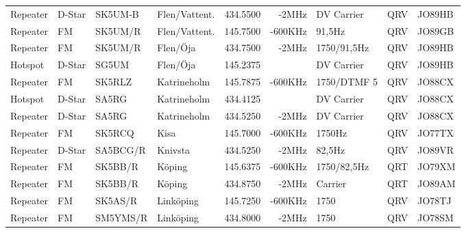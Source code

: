 \begin{landscape}
\begin{longtable}{llllrrlcl}
	Repeater          & D-Star       & SK5UM-B       & Flen/Vattent.     &          434.5500 &          -2MHz & DV Carrier      &       QRV       & JO89HB           \\
	Repeater          & FM           & SK5UM/R       & Flen/Vattent.     &          145.7500 &        -600KHz & 91,5Hz          &       QRV       & JO89GB           \\
	Repeater          & FM           & SK5UM/R       & Flen/Öja          &          434.7500 &          -2MHz & 1750/91,5Hz     &       QRV       & JO89HB           \\
	Hotspot           & D-Star       & SG5UM         & Flen/Öja          &          145.2375 &                & DV Carrier      &       QRV       & JO89HB           \\
	Repeater          & FM           & SK5RLZ        & Katrineholm       &          145.7875 &        -600KHz & 1750/DTMF 5     &       QRV       & JO88CX           \\
	Hotspot           & D-Star       & SA5RG         & Katrineholm       &          434.4125 &                & DV Carrier      &       QRV       & JO88CX           \\
	Repeater          & D-Star       & SA5RG         & Katrineholm       &          434.5250 &          -2MHz & DV Carrier      &       QRV       & JO88CX           \\
	Repeater          & FM           & SK5RCQ        & Kisa              &          145.7000 &        -600KHz & 1750Hz          &       QRV       & JO77TX           \\
	Repeater          & D-Star       & SA5BCG/R      & Knivsta           &          434.5250 &          -2MHz & 82,5Hz          &       QRV       & JO89VR           \\
	Repeater          & FM           & SK5BB/R       & Köping            &          145.6375 &        -600KHz & 1750/82,5Hz     &       QRT       & JO79XM           \\
	Repeater          & FM           & SK5BB/R       & Köping            &          434.8750 &          -2MHz & Carrier         &       QRT       & JO89AM           \\
	Repeater          & FM           & SK5AS/R       & Linköping         &          145.7250 &        -600KHz & 1750            &       QRV       & JO78TJ           \\
	Repeater          & FM           & SM5YMS/R      & Linköping         &          434.8000 &          -2MHz & 1750            &       QRV       & JO78SM           \\

\end{longtable}
\end{landscape}
